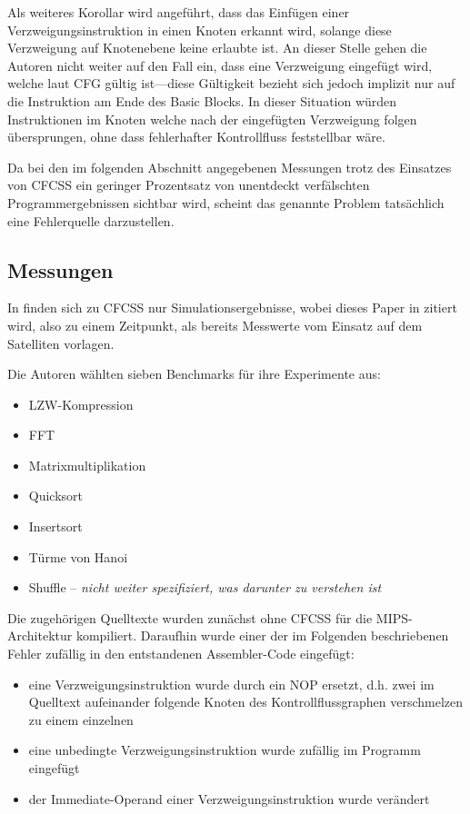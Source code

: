 \documentclass[11pt]{article}
\begin{document}
Als weiteres Korollar wird angeführt, dass das Einfügen einer
Verzweigungsinstruktion in einen Knoten erkannt wird, solange diese Verzweigung
auf Knotenebene keine erlaubte ist. An dieser Stelle gehen die Autoren nicht
weiter auf den Fall ein, dass eine Verzweigung eingefügt wird, welche laut CFG
gültig ist—diese Gültigkeit bezieht sich jedoch implizit nur auf die
Instruktion am Ende des Basic Blocks. In dieser Situation würden Instruktionen
im Knoten welche nach der eingefügten Verzweigung folgen übersprungen, ohne
dass fehlerhafter Kontrollfluss feststellbar wäre.

Da bei den im folgenden Abschnitt angegebenen Messungen trotz des Einsatzes von
CFCSS ein geringer Prozentsatz von unentdeckt verfälschten Programmergebnissen
sichtbar wird, scheint das genannte Problem tatsächlich eine Fehlerquelle
darzustellen.

\subsection{Messungen}

In \cite{oh-2002-control} finden sich zu CFCSS nur Simulationsergebnisse, wobei
dieses Paper in \cite{argos-2002-lessons} zitiert wird, also zu einem
Zeitpunkt, als bereits Messwerte vom Einsatz auf dem Satelliten vorlagen.

Die Autoren wählten sieben Benchmarks für ihre Experimente aus:

\begin{itemize}
  \item LZW-Kompression
  \item FFT
  \item Matrixmultiplikation
  \item Quicksort
  \item Insertsort
  \item Türme von Hanoi
  \item Shuffle – \emph{nicht weiter spezifiziert, was darunter zu verstehen ist}
\end{itemize}

Die zugehörigen Quelltexte wurden zunächst ohne CFCSS für die MIPS-Architektur
kompiliert. Daraufhin wurde einer der im Folgenden beschriebenen Fehler
zufällig in den entstandenen Assembler-Code eingefügt:

\begin{itemize}
  \item eine Verzweigungsinstruktion wurde durch ein NOP ersetzt,
        d.h. zwei im Quelltext aufeinander folgende Knoten des Kontrollflussgraphen
        verschmelzen zu einem einzelnen
  \item eine unbedingte Verzweigungsinstruktion wurde zufällig im Programm eingefügt
  \item der Immediate-Operand einer Verzweigungsinstruktion wurde verändert
\end{itemize}
\end{document}

